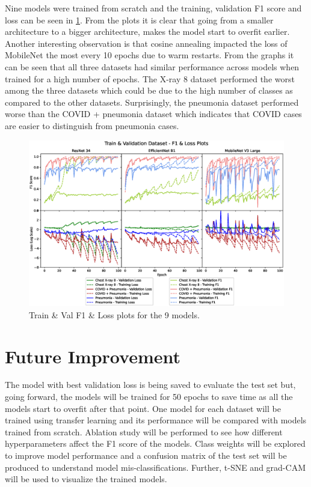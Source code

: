 \documentclass[10pt,twocolumn,letterpaper]{article}
\begin{document}
Nine models were trained from scratch and the training, validation F1 score and loss can be seen in \cref{fig:acc_loss_sep}. From the plots it is clear that going from a smaller architecture to a bigger architecture, makes the model start to overfit earlier. Another interesting observation is that cosine annealing impacted the loss of MobileNet the most every 10 epochs due to warm restarts. From the graphs it can be seen that all three datasets had similar performance across models when trained for a high number of epochs. The X-ray 8 dataset performed the worst among the three datasets which could be due to the high number of classes as compared to the other datasets. Surprisingly, the pneumonia dataset performed worse than the COVID + pneumonia dataset which indicates that COVID cases are easier to distinguish from pneumonia cases. 

\begin{figure}[t]
  \centering
  \includegraphics[width=1\linewidth]{f1_loss_separate.eps}  
   \caption{Train \& Val F1 \& Loss plots for the 9 models.}
   \vspace{-1.5em}
   \label{fig:acc_loss_sep}
\end{figure}

\section{Future Improvement}
\label{sec:future}
The model with best validation loss is being saved to evaluate the test set but, going forward, the models will be trained for 50 epochs to save time as all the models start to overfit after that point. One model for each dataset will be trained using transfer learning and its performance will be compared with models trained from scratch. Ablation study will be performed to see how different hyperparameters affect the F1 score of the models. Class weights will be explored to improve model performance and a confusion matrix of the test set will be produced to understand model mis-classifications. Further, t-SNE \cite{van2008visualizing} and grad-CAM \cite{jacobgilpytorchcam} will be used to visualize the trained models.

\clearpage
{\small


}
\end{document}
